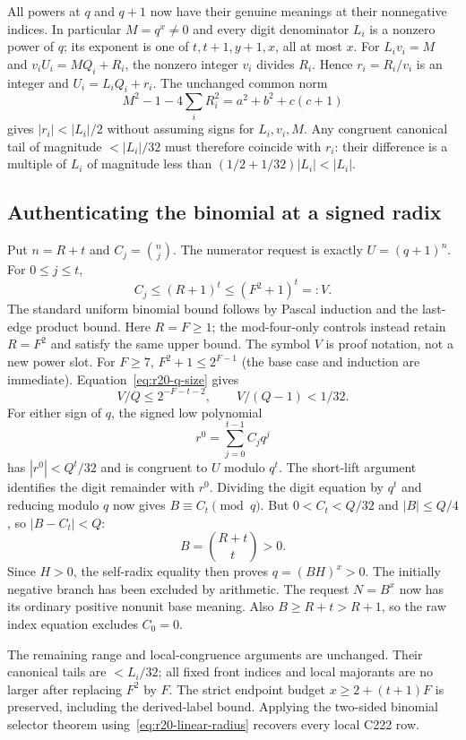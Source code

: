 All powers at $q$ and $q+1$ now have their genuine meanings at their
nonnegative indices.  In particular $M=q^x\ne0$ and every digit
denominator $L_i$ is a nonzero power of $q$; its exponent is one of
$t,t+1,y+1,x$, all at most $x$.
For $L_i v_i=M$ and $v_i U_i=M Q_i+R_i$, the nonzero integer $v_i$
divides $R_i$.  Hence $r_i=R_i/v_i$ is an integer and
$U_i=L_iQ_i+r_i$.  The unchanged common norm
\[
 M^2-1-4\sum_i R_i^2=a^2+b^2+c(c+1)
\]
gives $|r_i|<|L_i|/2$ without assuming signs for $L_i,v_i,M$.
Any congruent canonical tail of magnitude $<|L_i|/32$ must therefore
coincide with $r_i$: their difference is a multiple of $L_i$ of
magnitude less than $(1/2+1/32)|L_i|<|L_i|$.

\subsection{Authenticating the binomial at a signed radix}
Put $n=R+t$ and $C_j=\binom nj$.  The numerator request is exactly
$U=(q+1)^n$.  For $0\le j\le t$,
\[
 C_j\le(R+1)^t\le(F^2+1)^t=:V.
\]
The standard uniform binomial bound follows by Pascal induction and the
last-edge product bound.  Here $R=F\ge1$; the mod-four-only controls
instead retain $R=F^2$ and satisfy the same upper bound.
The symbol $V$ is proof notation, not a new power slot.
For $F\ge7$, $F^2+1\le2^{F-1}$ (the base case and induction are immediate).
Equation~\eqref{eq:r20-q-size} gives
\[
 V/Q\le2^{-F-t-2},\qquad V/(Q-1)<1/32.
\]
For either sign of $q$, the signed low polynomial
\[
 r^0=\sum_{j=0}^{t-1}C_jq^j
\]
has $|r^0|<Q^t/32$ and is congruent to $U$ modulo $q^t$.
The short-lift argument identifies the digit remainder with $r^0$.
Dividing the digit equation by $q^t$ and reducing modulo $q$ now gives
$B\equiv C_t\pmod q$.
But $0<C_t<Q/32$ and $|B|\le Q/4$, so $|B-C_t|<Q$:
\[
 B=\binom{R+t}{t}>0.
\]
Since $H>0$, the self-radix equality then proves $q=(BH)^x>0$.
The initially negative branch has been excluded by arithmetic.
The request $N=B^x$ now has its ordinary positive nonunit base meaning.
Also $B\ge R+t>R+1$, so the raw index equation excludes $C_0=0$.

The remaining range and local-congruence arguments are unchanged.
Their canonical tails are $<L_i/32$; all fixed front indices and local
majorants are no larger after replacing $F^2$ by $F$.
The strict endpoint budget $x\ge2+(t+1)F$ is preserved, including the
derived-label bound.  Applying the two-sided binomial selector theorem
using~\eqref{eq:r20-linear-radius} recovers every local C222 row.

